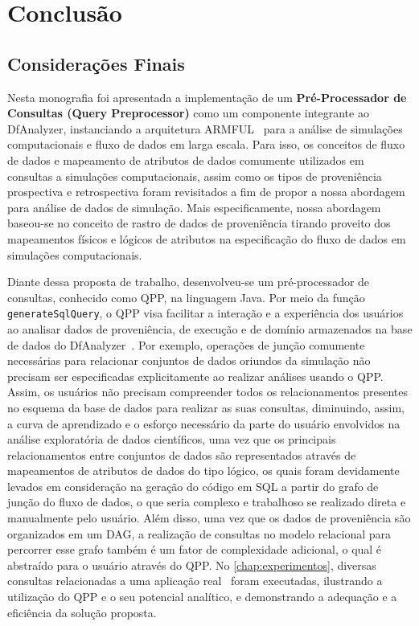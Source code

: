
\chapter{Conclusão}%
\label{chap:conclusao}

\section{Considerações Finais}

Nesta monografia foi apresentada a implementação de um \textbf{Pré-Processador de Consultas (Query Preprocessor)} como um componente integrante ao DfAnalyzer, instanciando a arquitetura ARMFUL~\cite{silva2017raw} para a análise de simulações computacionais e fluxo de dados em larga escala. Para isso, os conceitos de fluxo de dados e mapeamento de atributos de dados comumente utilizados em consultas a simulações computacionais, assim como os tipos de proveniência prospectiva e retrospectiva foram revisitados a fim de propor a nossa abordagem para análise de dados de simulação. Mais especificamente, nossa abordagem baseou-se no conceito de rastro de dados de proveniência tirando proveito dos mapeamentos físicos e lógicos de atributos na especificação do fluxo de dados em simulações computacionais. 

Diante dessa proposta de trabalho, desenvolveu-se um pré-processador de consultas, conhecido como QPP, na linguagem Java. Por meio da função \texttt{generateSqlQuery}, o QPP visa facilitar a interação e a experiência dos usuários ao analisar dados de proveniência, de execução e de domínio armazenados na base de dados do DfAnalyzer~\cite{gadelha2012mtcprov}. Por exemplo, operações de junção comumente necessárias para relacionar conjuntos de dados oriundos da simulação não precisam ser especificadas explicitamente ao realizar análises usando o QPP. Assim, os usuários não precisam compreender todos os relacionamentos presentes no esquema da base de dados para realizar as suas consultas, diminuindo, assim, a curva de aprendizado e o esforço necessário da parte do usuário envolvidos na análise exploratória de dados científicos, uma vez que os principais relacionamentos entre conjuntos de dados são representados através de mapeamentos de atributos de dados do tipo lógico, os quais foram devidamente levados em consideração na geração do código em SQL a partir do grafo de junção do fluxo de dados, o que seria complexo e trabalhoso se realizado direta e manualmente pelo usuário.
Além disso, uma vez que os dados de proveniência são organizados em um DAG, a realização de consultas no modelo relacional para percorrer esse grafo também é um fator de complexidade adicional, o qual é abstraído para o usuário através do QPP.
No \autoref{chap:experimentos}, diversas consultas relacionadas a uma aplicação real~\cite{silva2016situ} foram executadas, ilustrando a utilização do QPP e o seu potencial analítico, e demonstrando a adequação e a eficiência da solução proposta.

